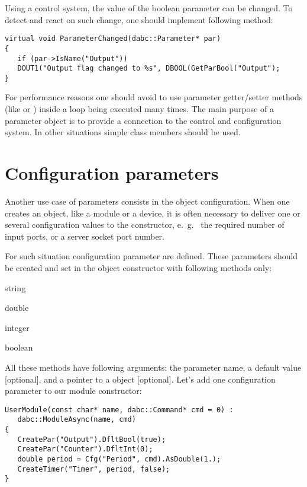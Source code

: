 Using a control system, the value of the boolean parameter can be changed. 
To detect and react on such change,
one should implement following method: 
 
\begin{verbatim}
virtual void ParameterChanged(dabc::Parameter* par) 
{
   if (par->IsName("Output")) 
   DOUT1("Output flag changed to %s", DBOOL(GetParBool("Output");
}
\end{verbatim}

For performance reasons one should avoid to use parameter getter/setter methods 
(like   or ) inside a loop 
being executed many times. The main purpose of a parameter
object is to provide a connection to the control and configuration system.
In other situations simple class members should be used.


\section{Configuration parameters}
\label{prog_setup_configurationparameter}
Another use case of parameters consists in the object configuration.
When one creates an object, like a module or a device, 
it is often necessary to deliver one or several configuration values 
to the constructor, e.~g.~ the required
number of input ports, or a server socket port number. 

For such situation configuration parameter are defined.
These parameters should be created and set 
in the object constructor with following methods only:


\bdes
\item[GetCfgStr]  string
\item[GetCfgDouble]   double 
\item[GetCfgInt]   integer
\item[GetCfgBool]   boolean 
\edes

All these methods have following arguments: the parameter name, 
a default value [optional], and a pointer to a  object [optional].
Let's add one configuration parameter to our module constructor:

\begin{small}
\begin{verbatim}
UserModule(const char* name, dabc::Command* cmd = 0) : 
   dabc::ModuleAsync(name, cmd)
{
   CreatePar("Output").DfltBool(true);
   CreatePar("Counter").DfltInt(0);
   double period = Cfg("Period", cmd).AsDouble(1.);
   CreateTimer("Timer", period, false);
}
\end{verbatim}
\end{small}

